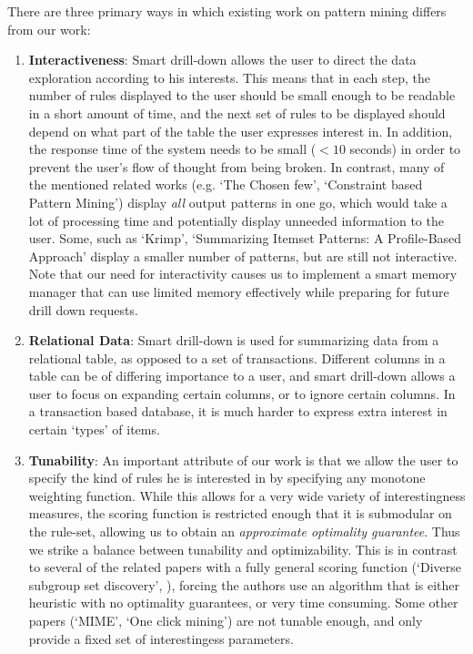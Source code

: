 \documentclass{article}
\begin{document}
There are three primary ways in which existing work on pattern mining differs from our work:
\begin{enumerate}
\item {\bf Interactiveness}: Smart drill-down allows the user to direct the data exploration according to his interests. This means that in each step, the number of rules displayed to the user should be small enough to be readable in a short amount of time, and the next set of rules to be displayed should depend on what part of the table the user expresses interest in. In addition, the response time of the system needs to be small ($< 10$ seconds) in order to prevent the user's flow of thought from being broken. In contrast, many of the mentioned related works (e.g. `The Chosen few', `Constraint based Pattern Mining') display {\em all} output patterns in one go, which would take a lot of processing time and potentially display unneeded information to the user. Some, such as `Krimp', `Summarizing Itemset Patterns: A Profile-Based Approach' display a smaller number of patterns, but are still not interactive. Note that our need for interactivity causes us to implement a smart memory manager that can use limited memory effectively while preparing for future drill down requests.

\item {\bf Relational Data}: Smart drill-down is used for summarizing data from a relational table, as opposed to a set of transactions. Different columns in a table can be of differing importance to a user, and smart drill-down allows a user to focus on expanding certain columns, or to ignore certain columns. In a transaction based database, it is much harder to express extra interest in certain `types' of items.  

\item {\bf Tunability}: An important attribute of our work is that we allow the user to specify the kind of rules he is interested in by specifying any monotone weighting function. While this allows for a very wide variety of interestingness measures, the scoring function is restricted enough that it is submodular on the rule-set, allowing us to obtain an {\em approximate optimality guarantee}. Thus we strike a balance between tunability and optimizability. This is in contrast to several of the related papers with a fully general scoring function (`Diverse subgroup set discovery', ), forcing the authors use an algorithm that is either heuristic with no optimality guarantees, or very time consuming. Some other papers (`MIME', `One click mining') are not tunable enough, and only provide a fixed set of interestingess parameters. 
\end{enumerate}
\end{document}
